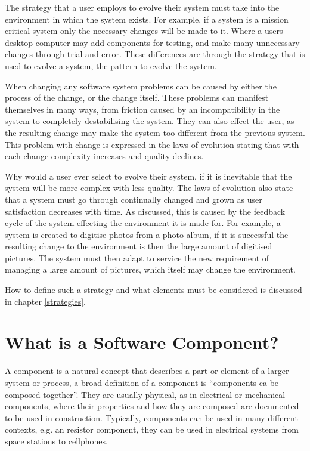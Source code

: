 The strategy that a user employs to evolve their system must take into the environment in which the system exists.
For example, if a system is a mission critical system only the necessary changes will be made to it.
Where a users desktop computer may add components for testing, and make many unnecessary changes through trial and error.
These differences are through the strategy that is used to evolve a system, the pattern to evolve the system.

When changing any software system problems can be caused by either the process of the change, or the change itself.
These problems can manifest themselves in many ways, from friction caused by an incompatibility in the system to completely destabilising the system.
They can also effect the user, as the resulting change may make the system too different from the previous system.
This problem with change is expressed in the laws of evolution stating that with each change complexity increases and quality declines.

Why would a user ever select to evolve their system, if it is inevitable that the system will be more complex with less quality. 
The laws of evolution also state that a system must go through continually changed and grown as user satisfaction decreases with time.
As discussed, this is caused by the feedback cycle of the system effecting the environment it is made for.
For example, a system is created to digitise photos from a photo album, if it is successful the resulting change to the environment is then the large amount of digitised pictures.
The system must then adapt to service the new requirement of managing a large amount of pictures, which itself may change the environment.

How to define such a strategy and what elements must be considered is discussed in chapter \ref{strategies}.

\section{What is a Software Component?}
\label{background.components}
A component is a natural concept that describes a part or element of a larger system or process,
a broad definition of a component is ``components ca be composed together''.
They are usually physical, as in electrical or mechanical components, where their properties and how they are composed are documented to be used in construction.
Typically, components can be used in many different contexts, e.g. an resistor component, they can be used in electrical systems from space stations to cellphones.   

